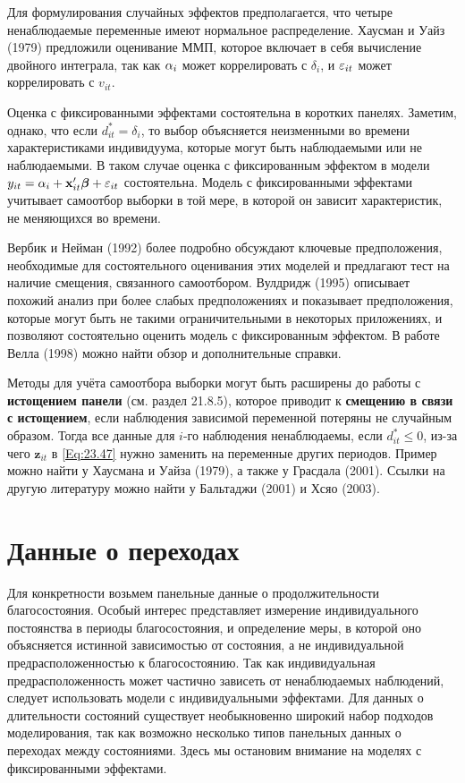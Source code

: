 Для формулирования случайных эффектов предполагается, что четыре ненаблюдаемые переменные имеют нормальное распределение. 
Хаусман и Уайз (1979) предложили оценивание ММП, которое включает в себя вычисление двойного интеграла, так как $\alpha_i$ может коррелировать с $\delta_i$, и $\varepsilon_{it}$ может коррелировать с $v_{it}$.

Оценка с фиксированными эффектами состоятельна в коротких панелях.  Заметим, однако, что если $d^*_{it}=\delta_i$, то выбор объясняется неизменными во времени характеристиками индивидуума, которые могут быть наблюдаемыми или не наблюдаемыми. В таком случае оценка с фиксированным эффектом в модели $y_{it} = \alpha_i+\mathbf{x}'_{it} \bm{\beta} + \varepsilon_{it}$ состоятельна. Модель с фиксированными эффектами учитывает самоотбор выборки в той мере, в которой он зависит характеристик, не меняющихся во времени.

Вербик и Нейман (1992) более подробно обсуждают ключевые предположения, необходимые для состоятельного оценивания этих моделей и предлагают тест на наличие смещения, связанного  самоотбором. Вулдридж (1995) описывает похожий анализ при более слабых предположениях и показывает предположения, которые могут быть не такими ограничительными в некоторых приложениях, и позволяют состоятельно оценить модель с фиксированным эффектом. В работе Велла (1998) можно найти обзор и дополнительные справки.

Методы для учёта самоотбора выборки могут быть расширены до работы с \textbf{истощением панели} (см. раздел 21.8.5), которое приводит к \textbf{смещению в связи с истощением}, если наблюдения зависимой переменной потеряны не случайным образом. Тогда все данные для $i$-го наблюдения ненаблюдаемы, если $d^*_{it} \leq 0$, из-за чего $\mathbf{z}_{it}$ в \ref{Eq:23.47} нужно заменить на переменные других периодов. Пример можно найти у Хаусмана и Уайза (1979), а также у Грасдала (2001). Ссылки на другую литературу можно найти у Бальтаджи (2001) и Хсяо (2003).

\section{Данные о переходах}

Для конкретности возьмем панельные данные о продолжительности благосостояния. Особый интерес представляет измерение индивидуального постоянства в периоды благосостояния, и определение меры, в которой оно объясняется истинной зависимостью от состояния, а не  индивидуальной предрасположенностью к благосостоянию. Так как индивидуальная предрасположенность может частично зависеть от ненаблюдаемых наблюдений, следует использовать модели с индивидуальными эффектами. Для данных о длительности состояний существует необыкновенно широкий набор подходов моделирования, так как возможно несколько типов панельных данных о переходах между состояниями. Здесь мы остановим внимание на моделях с фиксированными эффектами. 

